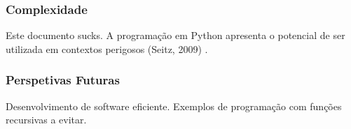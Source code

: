 \documentclass[12pt,a4paper,headsepline,bibtotoc,twoside]{scrbook}
\begin{document}
\subsubsection{Complexidade}
Este documento sucks. A programação em Python apresenta o potencial
de ser utilizada em contextos perigosos (Seitz, 2009) \cite{seitz09:_gray_hat_python}.

\subsubsection{Perspetivas Futuras}
Desenvolvimento de software eficiente. Exemplos de programação com
funções recursivas a evitar.


\end{document}
